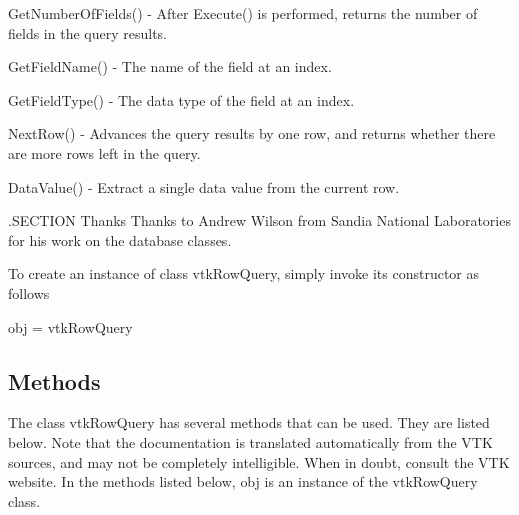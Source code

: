 Get\-Number\-Of\-Fields() -\/ After Execute() is performed, returns the number of fields in the query results.

Get\-Field\-Name() -\/ The name of the field at an index.

Get\-Field\-Type() -\/ The data type of the field at an index.

Next\-Row() -\/ Advances the query results by one row, and returns whether there are more rows left in the query.

Data\-Value() -\/ Extract a single data value from the current row.

.S\-E\-C\-T\-I\-O\-N Thanks Thanks to Andrew Wilson from Sandia National Laboratories for his work on the database classes.

To create an instance of class vtk\-Row\-Query, simply invoke its constructor as follows \begin{DoxyVerb}  obj = vtkRowQuery
\end{DoxyVerb}
 \hypertarget{vtkwidgets_vtkxyplotwidget_Methods}{}\subsection{Methods}\label{vtkwidgets_vtkxyplotwidget_Methods}
The class vtk\-Row\-Query has several methods that can be used. They are listed below. Note that the documentation is translated automatically from the V\-T\-K sources, and may not be completely intelligible. When in doubt, consult the V\-T\-K website. In the methods listed below, {\ttfamily obj} is an instance of the vtk\-Row\-Query class. 
